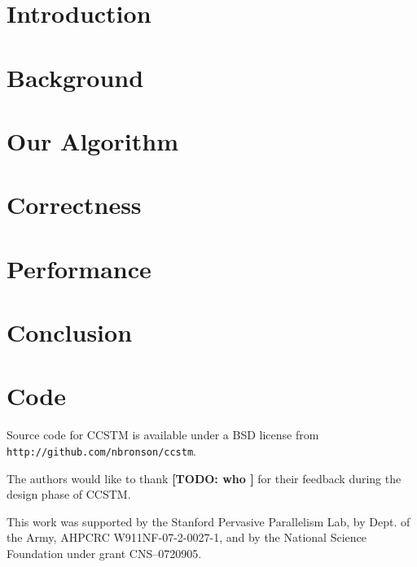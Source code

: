 \documentclass[preprint]{sigplanconf}
\newcommand{\todo}[1]{{\color{red} \bf [TODO: #1 ]}}
\begin{document}
\terms
\xterms

\keywords
\xkeywords

\section{Introduction}
\label{intro}
%

\section{Background}
\label{background}
%

\section{Our Algorithm}
\label{algorithm}
%

\section{Correctness}
\label{correctness}
%

\section{Performance}
\label{performance}
%

\section{Conclusion}
\label{conclusion}
%

\appendix
\section{Code}

Source code for CCSTM is available under a BSD license from
\texttt{http://github.com/nbronson/ccstm}.


\acks

The authors would like to thank \todo{who} for their feedback
during the design phase of CCSTM.

This work was supported by the Stanford Pervasive Parallelism Lab,
by Dept. of the Army, AHPCRC W911NF-07-2-0027-1, and by
the National Science Foundation under grant CNS--0720905.

{\small




}
\end{document}
